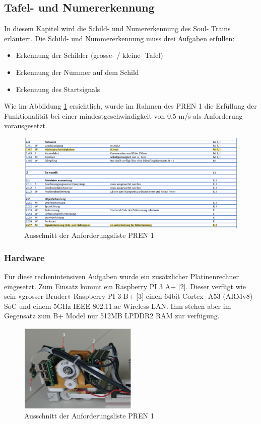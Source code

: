 \documentclass[../../main.tex]{subfiles}
\begin{document}
\subsection{Tafel- und Numererkennung}
In diesem Kapitel wird die Schild- und Numererkennung des Soul- Trains erläutert. Die Schild- und Nummererkennung muss drei Aufgaben erfüllen:
\begin{itemize}
  \item Erkennung der Schilder (grosse- / kleine- Tafel)
  \item Erkennung der Nummer auf dem Schild
  \item Erkennung des Startsignals
\end{itemize}

Wie im Abbildung \ref{fig:ausschnitt_Anforderungsliste} ersichtlich, wurde im Rahmen des PREN 1 die Erfüllung der Funktionalität bei einer mindestgeschwindigkeit von 0.5 m/s als Anforderung vorausgesetzt. 

\begin{figure}[H] %
  \centering
  \includegraphics[width=1\textwidth]{Anforderung.png}
  \caption{Ausschnitt der Anforderungsliste PREN 1}
  \label{fig:ausschnitt_Anforderungsliste}
\end{figure}


\subsubsection{Hardware}
Für diese rechenintensiven Aufgaben wurde ein zusätzlicher Platinenrechner eingesetzt. Zum Einsatz kommt ein Raspberry PI 3 A+ [2]. Dieser verfügt wie sein «grosser Bruder» Raspberry PI 3 B+ [3] einen 64bit Cortex- A53 (ARMv8) SoC und einem 5GHz IEEE 802.11.ac Wireless LAN. Ihm stehen aber im Gegensatz zum B+ Model nur 512MB LPDDR2 RAM zur verfügung.   

\begin{figure}[H] %
  \centering
  \includegraphics[width=0.5\textwidth]{RPI-uebersicht.png}
  \caption{Ausschnitt der Anforderungsliste PREN 1}
  \label{fig:rpi-uebersicht}
\end{figure}
\end{document}

